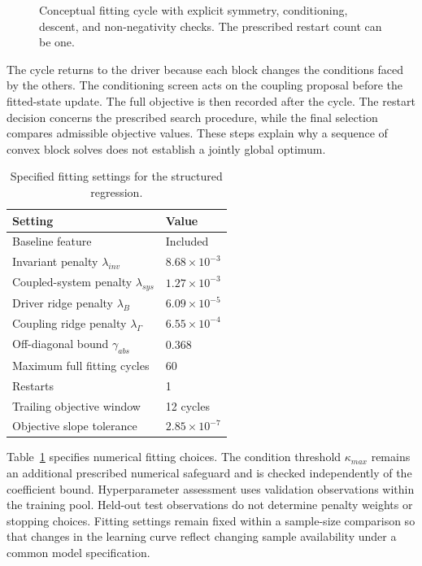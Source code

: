 \begin{figure}[htbp]
\centering

\caption{Conceptual fitting cycle with explicit symmetry, conditioning, descent, and non-negativity checks. The prescribed restart count can be one.}
\label{fig:ch5_training_cycle}
\end{figure}

The cycle returns to the driver because each block changes the conditions faced by the others. The conditioning screen acts on the coupling proposal before the fitted-state update. The full objective is then recorded after the cycle. The restart decision concerns the prescribed search procedure, while the final selection compares admissible objective values. These steps explain why a sequence of convex block solves does not establish a jointly global optimum.

\begin{table}[htbp]
\centering
\caption{Specified fitting settings for the structured regression.}
\label{tab:icsor_fitting_settings}
\begin{tabular}{ll}
\toprule
Setting & Value\\
\midrule
Baseline feature & Included\\
Invariant penalty \(\lambda_{inv}\) & \(8.68\times10^{-3}\)\\
Coupled-system penalty \(\lambda_{sys}\) & \(1.27\times10^{-3}\)\\
Driver ridge penalty \(\lambda_B\) & \(6.09\times10^{-5}\)\\
Coupling ridge penalty \(\lambda_{\Gamma}\) & \(6.55\times10^{-4}\)\\
Off-diagonal bound \(\gamma_{abs}\) & 0.368\\
Maximum full fitting cycles & 60\\
Restarts & 1\\
Trailing objective window & 12 cycles\\
Objective slope tolerance & \(2.85\times10^{-7}\)\\
\bottomrule
\end{tabular}
\end{table}

Table~\ref{tab:icsor_fitting_settings} specifies numerical fitting choices. The condition threshold \(\kappa_{max}\) remains an additional prescribed numerical safeguard and is checked independently of the coefficient bound. Hyperparameter assessment uses validation observations within the training pool. Held-out test observations do not determine penalty weights or stopping choices. Fitting settings remain fixed within a sample-size comparison so that changes in the learning curve reflect changing sample availability under a common model specification.

